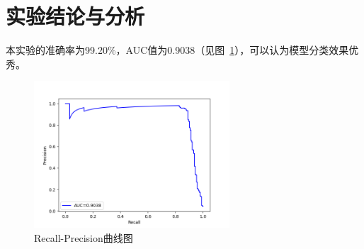 \documentclass[a4paper,12pt]{report}
\begin{document}
\section{实验结论与分析}
\par 本实验的准确率为99.20\%，AUC值为0.9038（见图~\ref{5.1}），可以认为模型分类效果优秀。
\begin{figure}[hbp]
    \centering
    \includegraphics[width=0.65\textwidth]{../datasets/exp5/auc.png}
    \caption{Recall-Precision曲线图}
    \label{5.1}
    \hfill
\end{figure}
\end{document}
